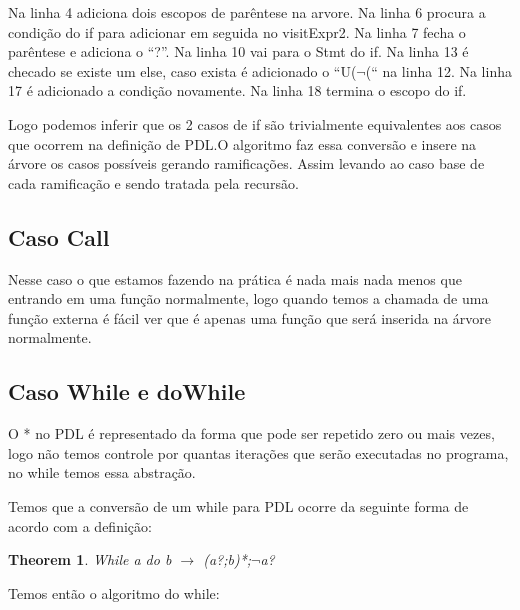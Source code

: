\documentclass{article}
\newtheorem{theorem}{Theorem}
\begin{document}
	Na linha 4 adiciona dois escopos de parêntese na arvore.
	Na linha 6 procura a condição do if para adicionar em seguida no visitExpr2.
	Na linha 7 fecha o parêntese e adiciona o “?”.
	Na linha 10 vai para o Stmt do if.
	Na linha 13 é checado se existe um else, caso exista é adicionado o “U($\neg$(“ na linha 12.
	Na linha 17 é adicionado a condição novamente.
	Na linha 18 termina o escopo do if.
	
	Logo podemos inferir que os 2 casos de if são trivialmente equivalentes aos casos que ocorrem na definição de PDL.O algoritmo faz essa conversão e insere na árvore os casos possíveis gerando ramificações. Assim levando ao caso base de cada ramificação e sendo tratada pela recursão.
	
	\subsection{Caso Call}
		Nesse caso o que estamos fazendo na prática é nada mais nada menos que entrando em uma função normalmente, logo quando temos a chamada de uma função externa é fácil ver que é apenas uma função que será inserida na árvore normalmente.
	
	\subsection{Caso While e doWhile}
		O * no PDL é representado da forma que pode ser repetido zero ou mais vezes, logo não temos controle por quantas iterações que serão executadas no programa, no while temos essa abstração.
		
		Temos que a conversão de um while para PDL ocorre da seguinte forma de acordo com a definição:
		
			\begin{theorem}
			While a do b $\rightarrow$ (a?;b)*;$\neg$a?
			\end{theorem}
		
		Temos então o algoritmo do while:
		
		\begin{algorithm}
		\end{algorithm}
	
\end{document}

